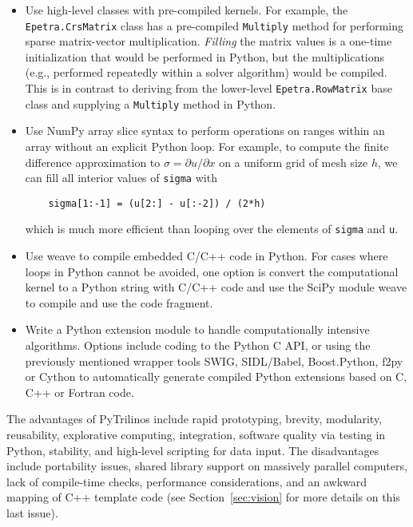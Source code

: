 \documentclass[11pt]{article}
\begin{document}
\begin{itemize}

\item Use high-level classes with pre-compiled kernels.  For example, the {\tt Epetra.CrsMatrix} class has a pre-compiled {\tt Multiply} method for performing sparse matrix-vector multiplication.  {\em Filling} the matrix values is a one-time initialization that would be performed in Python, but the multiplications (e.g., performed repeatedly within a solver algorithm) would be compiled.  This is in contrast to deriving from the lower-level {\tt Epetra.RowMatrix} base class and supplying a {\tt Multiply} method in Python.

\item Use NumPy array slice syntax to perform operations on ranges within an array without an explicit Python loop.  For example, to compute the finite difference approximation to $\sigma = \partial u/\partial x$ on a uniform grid of mesh size $h$, we can fill all interior values of {\tt sigma} with

\begin{verbatim}
    sigma[1:-1] = (u[2:] - u[:-2]) / (2*h)
\end{verbatim}

which is much more efficient than looping over the elements of {\tt sigma} and {\tt u}.

\item Use weave to compile embedded C/C++ code in Python.  For cases where loops in Python cannot be avoided, one option is convert the computational kernel to a Python string with C/C++ code and use the SciPy module weave to compile and use the code fragment.

\item Write a Python extension module to handle computationally intensive algorithms.  Options include coding to the Python C API, or using the previously mentioned wrapper tools SWIG, SIDL/Babel, Boost.Python, f2py or Cython to automatically generate compiled Python extensions based on C, C++ or Fortran code.
\end{itemize}

The advantages of PyTrilinos include rapid prototyping, brevity, modularity, reusability, explorative computing, integration, software quality via testing in Python, stability, and high-level scripting for data input.  The disadvantages include portability issues, shared library support on massively parallel computers, lack of compile-time checks, performance considerations, and an awkward mapping of C++ template code (see Section~\ref{sec:vision} for more details on this last issue).
\end{document}

